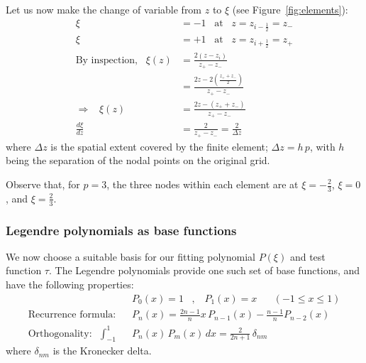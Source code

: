 \documentclass[10pt,a4paper]{article}
\begin{document}
Let us now make the change of variable from $z$ to $\xi$ (see
Figure~\ref{fig:elements}):
\begin{align*}
\xi & = -1 \;\;\; \mbox{at} \;\;\; z = z_{i-\frac{1}{2}} = z_- \\
\xi & = +1 \;\;\; \mbox{at} \;\;\; z = z_{i+\frac{1}{2}} = z_+ \\
\mbox{By inspection,} \;\;\; \xi(z) & = \frac{2(z-z_i)}{z_+ - z_-} \\
& = \frac{2z - 2 \left(\frac{z_+ + z_-}{2}\right)}{z_+ - z_-} \\
\Longrightarrow \;\;\; \xi(z) & = \frac{2z - (z_+ + z_-)}{z_+ - z_-} \\
\frac{d\xi}{dz} & = \frac{2}{z_+ - z_-} = \frac{2}{\Delta z}
\end{align*}
where $\Delta z$ is the spatial extent covered by the finite element; $\Delta
z = h\,p$, with $h$ being the separation of the nodal points on the original
grid.

Observe that, for $p=3$, the three nodes within each element are at $\xi =
-\frac{2}{3}$, $\xi = 0$, and $\xi = \frac{2}{3}$.

\subsubsection{Legendre polynomials as base functions}

We now choose a suitable basis for our fitting polynomial $P(\xi)$ and test
function $\tau$. The Legendre polynomials provide one such set of base
functions, and have the following properties:
\begin{align*}
& P_0(x) = 1 \;\;\; , \;\;\; P_1(x) = x \;\;\;\;\;\; (-1 \leq x \leq 1) \\
\mbox{Recurrence formula:} \;\;\; & P_n(x) = \frac{2n-1}{n} x \, P_{n-1}(x) -
\frac{n-1}{n} P_{n-2}(x) \\
\mbox{Orthogonality:} \;\;\; \int_{-1}^{1} & P_n(x) \, P_m(x) \, dx =
\frac{2}{2n+1} \, \delta_{nm}
\end{align*}
where $\delta_{nm}$ is the Kronecker delta.
\end{document}
